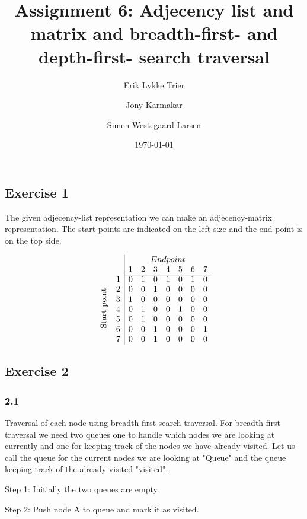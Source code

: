 \documentclass{article}
\title{Assignment 6: Adjecency list and matrix and breadth-first- and depth-first- search traversal}
\author{Erik Lykke Trier}
\author{Jony Karmakar}
\author{Simen Westegaard Larsen}
\date{\today}
\begin{document}
\maketitle
\subsection*{Exercise 1}
The given adjecency-list representation we can make an adjecency-matrix representation. The start points are indicated
on the left size and the end point is on the top side.

\[
\begin{array}{cc|ccccccc}
    & & \multicolumn{7}{c}{End point} \\
    & & 1 & 2 & 3 & 4 & 5 & 6 & 7 \\
\cline{3-9}
\multirow{7}{*}{\rotatebox{90}{Start point}} & 1 & 0 & 1 & 0 & 1 & 0 & 1 & 0 \\
    & 2 & 0 & 0 & 1 & 0 & 0 & 0 & 0 \\
    & 3 & 1 & 0 & 0 & 0 & 0 & 0 & 0 \\
    & 4 & 0 & 1 & 0 & 0 & 1 & 0 & 0 \\
    & 5 & 0 & 1 & 0 & 0 & 0 & 0 & 0 \\
    & 6 & 0 & 0 & 1 & 0 & 0 & 0 & 1 \\
    & 7 & 0 & 0 & 1 & 0 & 0 & 0 & 0 \\
\end{array}
\]


\subsection*{Exercise 2}
\subsubsection*{2.1}
Traversal of each node using breadth first search traversal. For breadth first traversal we need two queues one to handle which 
nodes we are looking at currently and one for keeping track of the nodes we have already visited. Let us call the queue for the 
current nodes we are looking at "Queue" and the queue keeping track of the already visited "visited". \newline

Step 1: Initially the two queues are empty.   \newline 

Step 2: Push node A to queue and mark it as visited. \newline   
\end{document}
